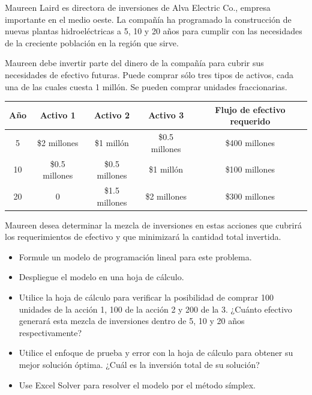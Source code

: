\begin{Ejer} Maureen Laird es directora de inversiones de Alva Electric Co., empresa importante en el medio oeste. La compa\~n\'ia ha programado la construcci\'on de nuevas plantas hidroel\'ectricas a 5, 10 y 20 a\~nos para cumplir con las necesidades de la creciente poblaci\'on en la regi\'on que sirve.

Maureen debe invertir parte del dinero de la compa\~n\'ia para cubrir sus necesidades de efectivo futuras. Puede comprar s\'olo tres tipos de activos, cada una de las cuales cuesta 1 mill\'on. Se pueden comprar unidades fraccionarias.

\begin{center}
\begin{tabular}{c|ccc|c}
\hline
A\~no & Activo 1 & Activo 2 & Activo 3 & Flujo de efectivo requerido \\
\hline
5 & \$2 millones & \$1 mill\'on & \$0.5 millones & \$400 millones \\
10 & \$0.5 millones & \$0.5 millones & \$1 mill\'on & \$100 millones \\
20 & 0 & \$1.5 millones & \$2 millones & \$300 millones \\
\hline
\end{tabular}
\end{center}

Maureen desea determinar la mezcla de inversiones en estas acciones que cubrir\'a los requerimientos de efectivo y que minimizar\'a la cantidad total invertida.

\begin{itemize}
\item[a)] Formule un modelo de programaci\'on lineal para este problema.
\item[b)] Despliegue el modelo en una hoja de c\'alculo.
\item[c)] Utilice la hoja de c\'alculo para verificar la posibilidad de comprar 100 unidades de la acci\'on 1, 100 de la acci\'on 2 y 200 de la 3. ¿Cu\'anto efectivo generar\'a esta mezcla de inversiones dentro de 5, 10 y 20 a\~nos respectivamente?
\item[d)] Utilice el enfoque de prueba y error con la hoja de c\'alculo para obtener su mejor soluci\'on \'optima. ¿Cu\'al es la inversi\'on total de su soluci\'on?
\item[e)] Use Excel Solver para resolver el modelo por el m\'etodo s\'implex.
\end{itemize}


\end{Ejer}


